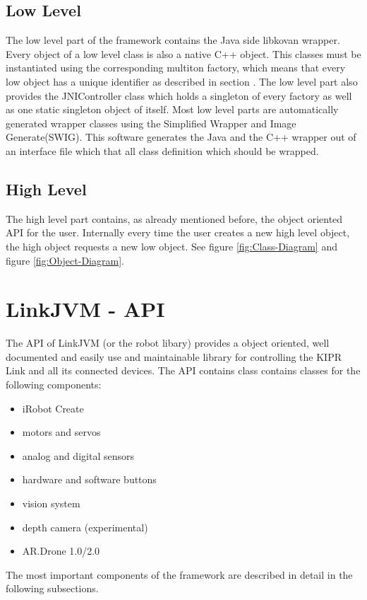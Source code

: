 \documentclass{juniorjournal}
\begin{document}
\subsection{Low Level}
The low level part of the framework contains the Java\cite{Java} side libkovan\cite{libkovan} wrapper. 
Every object of a low level class is also a native C++ object.
This classes must be instantiated using the corresponding multiton factory, which means that every low object has a unique identifier as described in section .
The low level part also provides the JNIController class which holds a singleton of every factory as well as one static singleton object of itself.
Most low level parts are automatically generated wrapper classes using the Simplified Wrapper and Image Generate(SWIG).
This software generates the Java and the C++ wrapper out of an interface file which that all class definition which should be wrapped.

\subsection{High Level}
The high level part contains, as already mentioned before, the object oriented API for the user. 
Internally every time the user creates a new high level object, the high object requests a new low object.
See figure \ref{fig:Class-Diagram} and figure \ref{fig:Object-Diagram}.

\section{LinkJVM - API}
The API of LinkJVM (or the robot libary) provides a object oriented, well documented and easily use and maintainable library for controlling the KIPR\cite{KIPR} Link\cite{link}
 and all its connected devices.
The API contains class contains classes for the following components:
\begin{itemize}
	\item iRobot Create\cite{create}
	\item motors and servos
	\item analog and digital sensors
	\item hardware and software buttons
	\item vision system
	\item depth camera (experimental)
	\item AR.Drone 1.0/2.0\cite{ar.drone}
\end{itemize}
The most important components of the framework are described in detail in the following subsections.
\end{document}

